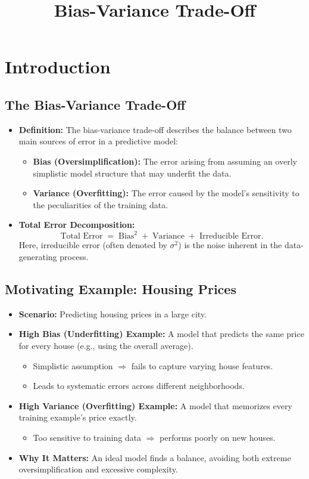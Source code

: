 \documentclass{article}
\title{Bias-Variance Trade-Off}
\author{}
\date{}
\begin{document}
\maketitle

\section{Introduction}

\subsection{The Bias-Variance Trade-Off}
\begin{itemize}
    \item \textbf{Definition:} The bias-variance trade-off describes the balance between two main sources of error in a predictive model:
    \begin{itemize}
        \item \textbf{Bias (Oversimplification):} The error arising from assuming an overly simplistic model structure that may underfit the data.
        \item \textbf{Variance (Overfitting):} The error caused by the model's sensitivity to the peculiarities of the training data.
    \end{itemize}
    \item \textbf{Total Error Decomposition:}
    \[
    \text{Total Error} \;=\; \text{Bias}^2 \;+\; \text{Variance} \;+\; \text{Irreducible Error}.
    \]
    Here, irreducible error (often denoted by $\sigma^2$) is the noise inherent in the data-generating process.
\end{itemize}

\subsection{Motivating Example: Housing Prices}
\begin{itemize}
    \item \textbf{Scenario:} Predicting housing prices in a large city.
    \item \textbf{High Bias (Underfitting) Example:} A model that predicts the same price for every house (e.g., using the overall average). 
    \begin{itemize}
        \item Simplistic assumption $\Rightarrow$ fails to capture varying house features.
        \item Leads to systematic errors across different neighborhoods.
    \end{itemize}
    \item \textbf{High Variance (Overfitting) Example:} A model that memorizes every training example's price exactly.
    \begin{itemize}
        \item Too sensitive to training data $\Rightarrow$ performs poorly on new houses.
    \end{itemize}
    \item \textbf{Why It Matters:} An ideal model finds a balance, avoiding both extreme oversimplification and excessive complexity.
\end{itemize}
\end{document}
